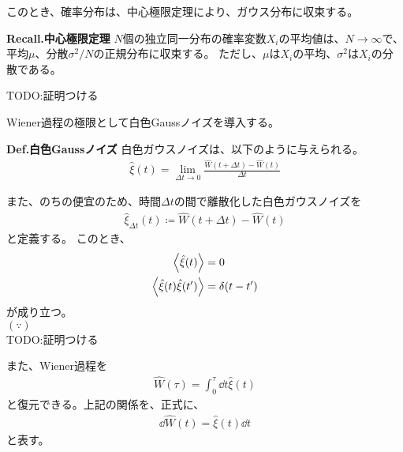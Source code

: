 \documentclass[a4paper,11pt]{jsarticle}
\numberwithin{equation}{section}
\begin{document}
このとき、確率分布は、中心極限定理により、ガウス分布に収束する。
\begin{itembox}[l]{\textbf{Recall.中心極限定理}}
    $N$個の独立同一分布の確率変数$X_i$の平均値は、$N \to \infty$で、平均$\mu$、分散$\sigma^2/N$の正規分布に収束する。
    ただし、$\mu$は$X_i$の平均、$\sigma^2$は$X_i$の分散である。

\end{itembox}
TODO:証明つける

Wiener過程の極限として白色Gaussノイズを導入する。
\begin{itembox}[l]{\textbf{Def.白色Gaussノイズ}}
    白色ガウスノイズは、以下のように与えられる。
    \begin{align}
        \hat{\xi}(t) = \lim_{\Delta t \to 0} \frac{\hat{W}(t+\Delta t) - \hat{W}(t)}{\Delta t}
    \end{align}
\end{itembox}
また、のちの便宜のため、時間$\Delta t$の間で離散化した白色ガウスノイズを
\begin{align}
    \hat{\xi}_{\Delta t}(t) \coloneq \hat{W}(t+\Delta t) - \hat{W}(t)
\end{align}
と定義する。
このとき、
\begin{align}
    \ev{\hat{\xi}(t)} &= 0 \\
    \ev{\hat{\xi}(t) \hat{\xi}(t')} &= \delta(t-t') 
\end{align}
が成り立つ。\\
$(\because)$\\
TODO:証明つける

また、Wiener過程を
\begin{align}
    \hat{W}(\tau) = \int_0^{\tau} \dd{t} \hat{\xi}(t)
\end{align}
と復元できる。上記の関係を、正式に、
\begin{align}
    \dd{\hat{W}(t)} = \hat{\xi}(t) \dd{t}
\end{align}
と表す。
\end{document}
